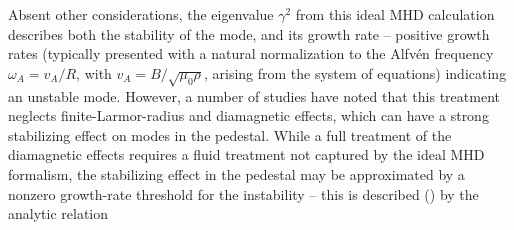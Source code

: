 \begin{figure}[t]
 \pushtooutside
\end{figure}

Absent other considerations, the eigenvalue $\gamma^2$ from this ideal MHD calculation describes both the stability of the mode, and its growth rate -- positive growth rates (typically presented with a natural normalization to the Alfv\'en frequency $\omega_A = v_A/R$, with $v_A = B/\sqrt{\mu_0 \rho}$, arising from the system of equations) indicating an unstable mode.  However, a number of studies \cite{Rogers1999,Huysmans2001,Snyder2003} have noted that this treatment neglects finite-Larmor-radius and diamagnetic effects, which can have a strong stabilizing effect on modes in the pedestal.  While a full treatment of the diamagnetic effects requires a fluid treatment not captured by the ideal MHD formalism, the stabilizing effect in the pedestal may be approximated by a nonzero growth-rate threshold for the instability -- this is described (\cf \cite{Snyder2002}) by the analytic relation

